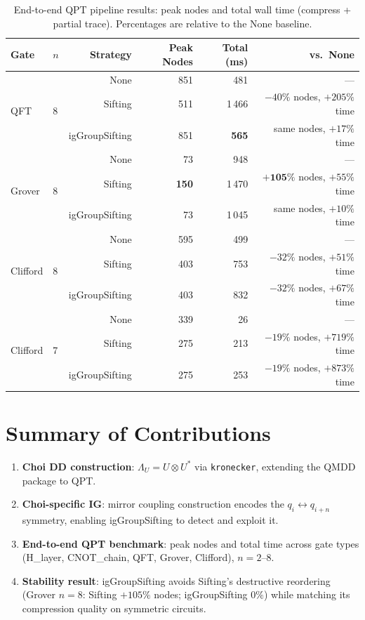 \documentclass[11pt,a4paper]{article}
\begin{document}
\begin{table}[h]
\centering
\caption{End-to-end QPT pipeline results: peak nodes and total wall time
  (compress + partial trace). Percentages are relative to the None baseline.}
\label{tab:e2e}
\begin{tabular}{llrrrr}
\toprule
Gate & $n$ & Strategy & Peak Nodes & Total (ms) & vs.\ None \\
\midrule
\multirow{3}{*}{QFT} & \multirow{3}{*}{8}
  & None           & 851 &    481 & --- \\
  && Sifting        & 511 & 1\,466 & $-40\%$ nodes, $+205\%$ time \\
  && igGroupSifting & 851 & \textbf{565} & same nodes, $+17\%$ time \\
\midrule
\multirow{3}{*}{Grover} & \multirow{3}{*}{8}
  & None           &  73 &    948 & --- \\
  && Sifting        & \textbf{150} & 1\,470 & $\mathbf{+105\%}$ nodes, $+55\%$ time \\
  && igGroupSifting &  73 & 1\,045 & same nodes, $+10\%$ time \\
\midrule
\multirow{3}{*}{Clifford} & \multirow{3}{*}{8}
  & None           & 595 &    499 & --- \\
  && Sifting        & 403 &    753 & $-32\%$ nodes, $+51\%$ time \\
  && igGroupSifting & 403 &    832 & $-32\%$ nodes, $+67\%$ time \\
\midrule
\multirow{3}{*}{Clifford} & \multirow{3}{*}{7}
  & None           & 339 &     26 & --- \\
  && Sifting        & 275 &    213 & $-19\%$ nodes, $+719\%$ time \\
  && igGroupSifting & 275 &    253 & $-19\%$ nodes, $+873\%$ time \\
\bottomrule
\end{tabular}
\end{table}

\section{Summary of Contributions}

\begin{enumerate}
  \item \textbf{Choi DD construction}: $\Lambda_U = U \otimes U^*$ via
    \texttt{kronecker}, extending the QMDD package to QPT.
  \item \textbf{Choi-specific IG}: mirror coupling construction encodes
    the $q_i \leftrightarrow q_{i+n}$ symmetry, enabling igGroupSifting
    to detect and exploit it.
  \item \textbf{End-to-end QPT benchmark}: peak nodes and total time across
    gate types (H\_layer, CNOT\_chain, QFT, Grover, Clifford), $n=2$--$8$.
  \item \textbf{Stability result}: igGroupSifting avoids Sifting's destructive
    reordering (Grover $n=8$: Sifting $+105\%$ nodes; igGroupSifting $0\%$)
    while matching its compression quality on symmetric circuits.
\end{enumerate}
\end{document}
